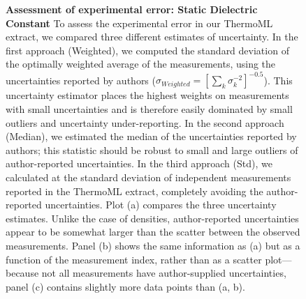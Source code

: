 \documentclass[aip, jcp, reprint]{revtex4-1}  %
\begin{document}
\begin{figure}



\caption{{\bf Assessment of experimental error: Static Dielectric Constant}
To assess the experimental error in our ThermoML extract, we compared three different estimates of uncertainty.  
In the first approach (Weighted), we computed the standard deviation of the optimally weighted average of the measurements, using the uncertainties reported by authors ($\sigma_{Weighted} = [\sum_k \sigma_k^{-2}]^{-0.5}$).
This uncertainty estimator places the highest weights on measurements with small uncertainties and is therefore easily dominated by small outliers and uncertainty under-reporting.
In the second approach (Median), we estimated the median of the uncertainties reported by authors; this statistic should be robust to small and large outliers of author-reported uncertainties.
In the third approach (Std), we calculated at the standard deviation of independent measurements reported in the ThermoML extract, completely avoiding the author-reported uncertainties.
Plot (a) compares the three uncertainty estimates.
Unlike the case of densities, author-reported uncertainties appear to be somewhat larger than the scatter between the observed measurements.
Panel (b) shows the same information as (a) but as a function of the measurement index, rather than as a scatter plot---because not all measurements have author-supplied uncertainties, panel (c) contains slightly more data points than (a, b).  
}
\label{figure:ErrorAnalysisDielectric}

\end{figure}
\end{document}
